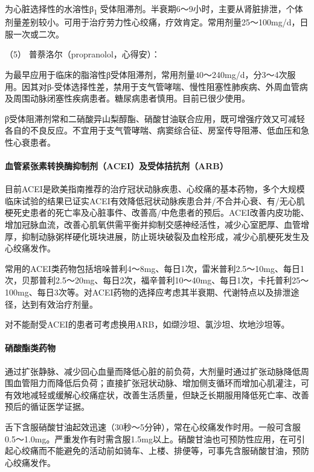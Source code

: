 为心脏选择性的水溶性β\textsubscript{1}
受体阻滞剂。半衰期6～9小时，主要从肾脏排泄，个体剂量差别较小。可用于治疗劳力性心绞痛，疗效肯定。常用剂量25～100mg/d，日服一次或二次。

\hypertarget{text00309.htmlux5cux23CHP10-7-3-1-2-2-5}{}
（5） 普萘洛尔（propranolol，心得安）：

为最早应用于临床的脂溶性β受体阻滞剂，常用剂量40～240mg/d，分3～4次服用。因其对β-受体选择性差，禁用于支气管哮喘、慢性阻塞性肺疾病、外周血管病及周围动脉闭塞性疾病患者。糖尿病患者慎用。目前已很少使用。

β受体阻滞剂常和二硝酸异山梨醇酯、硝酸甘油联合应用，既可增强疗效又可减轻各自的不良反应。不宜用于支气管哮喘、病窦综合征、房室传导阻滞、低血压和急性心衰患者。

\paragraph{血管紧张素转换酶抑制剂（ACEI）及受体拮抗剂（ARB）}


目前ACEI是欧美指南推荐的治疗冠状动脉疾患、心绞痛的基本药物，多个大规模临床试验的结果已证实ACEI有效降低冠状动脉疾患合并/不合并心衰、有/无心肌梗死史患者的死亡率及心脏事件、改善高/中危患者的预后。ACEI改善内皮功能、增加冠脉血流，改善心肌氧供需平衡并抑制交感神经活性，减少心室肥厚、血管增厚，抑制动脉粥样硬化斑块进展，防止斑块破裂及血栓形成，减少心肌梗死发生及心绞痛发作。

常用的ACEI类药物包括培哚普利4～8mg、每日1次，雷米普利2.5～10mg、每日1次，贝那普利2.5～20mg、每日2次，福辛普利10～40mg、每日1次，卡托普利25～100mg、每日3次等。对ACEI药物的选择应考虑其半衰期、代谢特点以及排泄途径，达到有效治疗剂量。

对不能耐受ACEI的患者可考虑换用ARB，如缬沙坦、氯沙坦、坎地沙坦等。

\paragraph{硝酸酯类药物}

通过扩张静脉、减少回心血量而降低心脏的前负荷，大剂量时通过扩张动脉降低周围血管阻力而降低后负荷；直接扩张冠状动脉、增加侧支循环而增加心肌灌注，可有效地减轻或缓解心绞痛症状，改善生活质量，但缺乏长期服用降低死亡率、改善预后的循证医学证据。

舌下含服硝酸甘油起效迅速（30秒～5分钟），常在心绞痛发作时用。一般可含服0.5～1.0mg。严重发作有时需含服1.5mg以上。硝酸甘油也可预防性应用，在可引起心绞痛而不能避免的活动前如骑车、上楼、排便等，可事先含服硝酸甘油，预防心绞痛发作。

